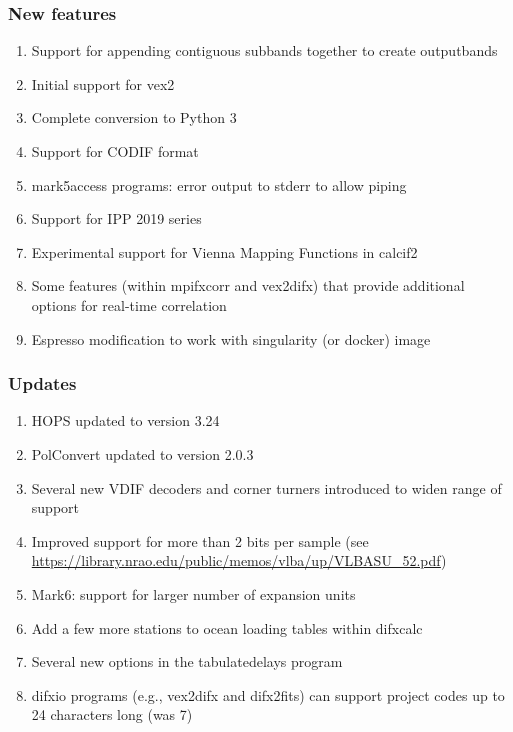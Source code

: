 \subsubsection{New features}
\begin{enumerate}
\item Support for appending contiguous subbands together to create outputbands
\item Initial support for vex2
\item Complete conversion to Python 3
\item Support for CODIF format
\item mark5access programs: error output to stderr to allow piping
\item Support for IPP 2019 series
\item Experimental support for Vienna Mapping Functions in calcif2
\item Some features (within mpifxcorr and vex2difx) that provide additional options for real-time correlation
\item Espresso modification to work with singularity (or docker) image
\end{enumerate}

\subsubsection{Updates}
\begin{enumerate}
\item HOPS updated to version 3.24
\item PolConvert updated to version 2.0.3
\item Several new VDIF decoders and corner turners introduced to widen range of support
\item Improved support for more than 2 bits per sample (see \url{https://library.nrao.edu/public/memos/vlba/up/VLBASU_52.pdf})
\item Mark6: support for larger number of expansion units
\item Add a few more stations to ocean loading tables within difxcalc
\item Several new options in the tabulatedelays program
\item difxio programs (e.g., vex2difx and difx2fits) can support project codes up to 24 characters long (was 7)
\end{enumerate}

